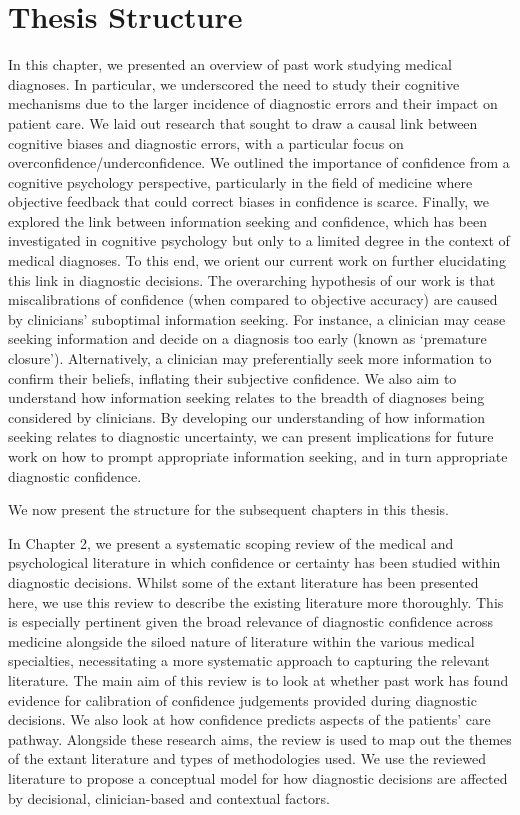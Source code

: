 \documentclass[a4paper, nobind]{templates/ociamthesis}
\begin{document}
\newpage

\section{Thesis Structure}\label{thesis-structure}

In this chapter, we presented an overview of past work studying medical diagnoses. In particular, we underscored the need to study their cognitive mechanisms due to the larger incidence of diagnostic errors and their impact on patient care. We laid out research that sought to draw a causal link between cognitive biases and diagnostic errors, with a particular focus on overconfidence/underconfidence. We outlined the importance of confidence from a cognitive psychology perspective, particularly in the field of medicine where objective feedback that could correct biases in confidence is scarce. Finally, we explored the link between information seeking and confidence, which has been investigated in cognitive psychology but only to a limited degree in the context of medical diagnoses. To this end, we orient our current work on further elucidating this link in diagnostic decisions. The overarching hypothesis of our work is that miscalibrations of confidence (when compared to objective accuracy) are caused by clinicians' suboptimal information seeking. For instance, a clinician may cease seeking information and decide on a diagnosis too early (known as `premature closure'). Alternatively, a clinician may preferentially seek more information to confirm their beliefs, inflating their subjective confidence. We also aim to understand how information seeking relates to the breadth of diagnoses being considered by clinicians. By developing our understanding of how information seeking relates to diagnostic uncertainty, we can present implications for future work on how to prompt appropriate information seeking, and in turn appropriate diagnostic confidence.

\hfill\break
We now present the structure for the subsequent chapters in this thesis.

\hfill\break
In Chapter 2, we present a systematic scoping review of the medical and psychological literature in which confidence or certainty has been studied within diagnostic decisions. Whilst some of the extant literature has been presented here, we use this review to describe the existing literature more thoroughly. This is especially pertinent given the broad relevance of diagnostic confidence across medicine alongside the siloed nature of literature within the various medical specialties, necessitating a more systematic approach to capturing the relevant literature. The main aim of this review is to look at whether past work has found evidence for calibration of confidence judgements provided during diagnostic decisions. We also look at how confidence predicts aspects of the patients' care pathway. Alongside these research aims, the review is used to map out the themes of the extant literature and types of methodologies used. We use the reviewed literature to propose a conceptual model for how diagnostic decisions are affected by decisional, clinician-based and contextual factors.
\end{document}
